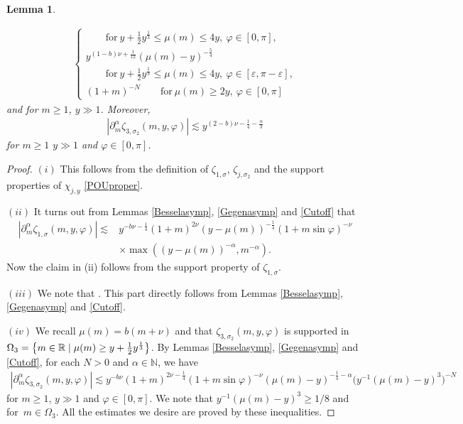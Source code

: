 \documentclass[pdftex]{sigma}
\numberwithin{equation}{section}
\newtheorem{Lemma}[Theorem]{Lemma}
\def\R{\mathbb{R}}%
\def\a{\alpha}
\def\e{\varepsilon}
\def\f{\varphi}
\def\m{\mu}
\def\n{\nu}
\def\s{\sigma}
\def\z{\zeta}
\def\pa{\partial}
\begin{document}
\begin{Lemma}
\begin{itemize}
\begin{align*}
\begin{cases}
\qquad \text{for}\  y+\frac{1}{2}y^{\frac{1}{3}}\leq \m(m)\leq 4y,\  \f\in [0,\pi],\\
y^{(1-b)\n+\frac{1}{12}}(\m(m)-y)^{-\frac{5}{4}}\\
\qquad \text{for}\  y+\frac{1}{2}y^{\frac{1}{3}}\leq \m(m)\leq 4y,\  \f\in [\e,\pi-\e],\\
(1+m)^{-N}\qquad \text{for}\  \m(m)\geq 2y,\  \f\in [0,\pi]
\end{cases}
\end{align*}
and for $m\geq 1$, $y\gg 1$. Moreover,
\begin{align*}
|\pa_{m}^{\a}\z_{3,\s_2}(m,y,\f)|\lesssim y^{(2-b)\n-\frac{1}{4}-\frac{\a}{3}}
\end{align*}
for $m\geq 1$ $y\gg 1$ and $\f\in [0,\pi]$.
\end{itemize}
\end{Lemma}

\begin{proof}
 $(i)$ This follows from the definition of $\z_{1,\s}$, $\z_{j,\s_2}$ and the support properties of $\chi_{j,y}$ \eqref{POUproper}.

$(ii)$ It turns out from Lemmas \ref{Besselasymp}, \ref{Gegenasymp} and \ref{Cutoff} that
\begin{align*}
|\pa_{m}^{\a}\z_{1,\s}(m,y,\f)|\lesssim {}&y^{-b\n-\frac{1}{4}}(1+m)^{2\n}(y-\m(m))^{-\frac{1}{4}}(1+m\sin \f)^{-\n}\\
&\times \max((y-\m(m))^{-\a}, m^{-\a}).
\end{align*}
Now the claim in (ii) follows from the support property of $\z_{1,\s}$.

 $(iii)$ We note that \smash{$\Omega_2=\big\{m\in\R\mid y-2y^{\frac{1}{3}}\leq \m(m)\leq y+2y^{\frac{1}{3}}\big\}$}. This part directly follows from Lemmas \ref{Besselasymp}, \ref{Gegenasymp} and \ref{Cutoff}.

 $(iv)$ We recall $\m(m)=b(m+\n)$ and that $\z_{3,\s_2}(m,y,\f)$ is supported in $\Omega_3=\big\{m\in\R\mid \m(m)\geq y+\smash{\frac{1}{2}y^{\frac{1}{3}}}\big\}$.
By Lemmas \ref{Besselasymp}, \ref{Gegenasymp} and \ref{Cutoff}, for each $N>0$ and $\a\in\mathbb{N}$, we have
\begin{align*}
|\pa_{m}^{\a}\z_{3,\s_2}(m,y,\f)|\lesssim y^{-b\n}(1+m)^{2\n-\frac{1}{4}}(1+m\sin \f)^{-\n}(\m(m)-y)^{-\frac{1}{4}-\a}\bigl(y^{-1}(\m(m)-y)^3\bigr)^{-N}
\end{align*}
for $m\geq 1$, $y\gg 1$ and $\f\in [0,\pi]$. We note that $y^{-1}(\m(m)-y)^3\geq 1/8$ and \smash{$\m(m)-y\geq \frac{1}{2}y^{\frac{1}{3}}$} for~${m\in \Omega_3}$. All the estimates we desire are proved by these inequalities.
\end{proof}
\end{document}
